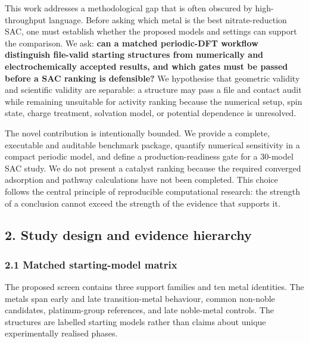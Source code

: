\documentclass[
]{article}
\begin{document}
This work addresses a methodological gap that is often obscured by
high-throughput language. Before asking which metal is the best
nitrate-reduction SAC, one must establish whether the proposed models
and settings can support the comparison. We ask: \textbf{can a matched
periodic-DFT workflow distinguish file-valid starting structures from
numerically and electrochemically accepted results, and which gates must
be passed before a SAC ranking is defensible?} We hypothesise that
geometric validity and scientific validity are separable: a structure
may pass a file and contact audit while remaining unsuitable for
activity ranking because the numerical setup, spin state, charge
treatment, solvation model, or potential dependence is unresolved.

The novel contribution is intentionally bounded. We provide a complete,
executable and auditable benchmark package, quantify numerical
sensitivity in a compact periodic model, and define a
production-readiness gate for a 30-model SAC study. We do not present a
catalyst ranking because the required converged adsorption and pathway
calculations have not been completed. This choice follows the central
principle of reproducible computational research: the strength of a
conclusion cannot exceed the strength of the evidence that supports it.

\hypertarget{study-design-and-evidence-hierarchy}{%
\subsection{2. Study design and evidence
hierarchy}\label{study-design-and-evidence-hierarchy}}

\hypertarget{matched-starting-model-matrix}{%
\subsubsection{2.1 Matched starting-model
matrix}\label{matched-starting-model-matrix}}

The proposed screen contains three support families and ten metal
identities. The metals span early and late transition-metal behaviour,
common non-noble candidates, platinum-group references, and late
noble-metal controls. The structures are labelled starting models rather
than claims about unique experimentally realised phases.
\end{document}
